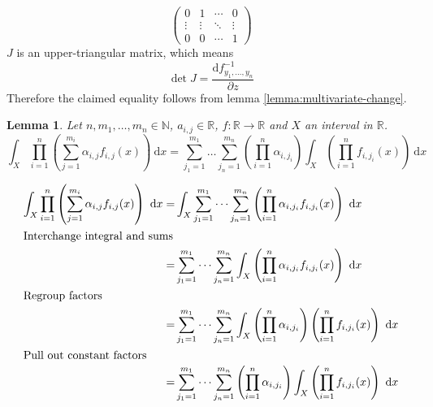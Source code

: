 \documentclass[11pt,a4paper]{book}
\newtheorem{lemma}{Lemma}
\begin{document}
\begin{proof2}
\begin{equation*}
\begin{pmatrix}
      0 & 1 & \cdots & 0\\
      \vdots & \vdots & \ddots & \vdots\\
      0 & 0 & \cdots & 1
    \end{pmatrix}
  \end{equation*}
  $J$ is an upper-triangular matrix, which means
  \begin{equation*}
    \det J = \frac{\mathrm{d}f_{y_{1}, \dots, y_{n}}^{-1}}{\partial z}
  \end{equation*}
  Therefore the claimed equality follows from lemma \ref{lemma:multivariate-change}.
\end{proof2}

\begin{lemma}
  \label{lemma:pull-out}
  Let $n, m_{1}, \dots, m_{n} \in \mathbb{N}$, $a_{i, j} \in \mathbb{R}$,
  $f : \mathbb{R} \rightarrow \mathbb{R}$ and $X$ an interval in $\mathbb{R}$.
  \begin{equation*}
    \int_{X} \prod_{i = 1}^{n} \left( \sum_{j = 1}^{m_{i}} \alpha_{i, j} f_{i, j}(x) \right)~\mathrm{d}x = \sum_{j_{1} = 1}^{m_{1}} \dots \sum_{j_{n} = 1}^{m_{n}} \left( \prod_{i = 1}^{n} \alpha_{i, j_{i}} \right) \int_{X} \left( \prod_{i = 1}^{n} f_{i, j_{i}}(x) \right)~\mathrm{d}x
  \end{equation*}
\end{lemma}
\begin{proof2}
  \begin{align*}
    \int_{X} \prod_{i = 1}^{n} \left( \sum_{j = 1}^{m_{i}} \alpha_{i, j} f_{i, j}(x) \right)~\mathrm{d}x = & \int_{X} \sum_{j_{1} = 1}^{m_{1}} \dots \sum_{j_{n} = 1}^{m_{n}} \left( \prod_{i = 1}^{n} \alpha_{i, j_{i}} f_{i, j_{i}}(x) \right)~\mathrm{d}x\\
    \intertext{Interchange integral and sums}
    = & \sum_{j_{1} = 1}^{m_{1}} \dots \sum_{j_{n} = 1}^{m_{n}} \int_{X} \left( \prod_{i = 1}^{n} \alpha_{i, j_{i}} f_{i, j_{i}}(x) \right)~\mathrm{d}x\\
    \intertext{Regroup factors}
    = & \sum_{j_{1} = 1}^{m_{1}} \dots \sum_{j_{n} = 1}^{m_{n}} \int_{X} \left( \prod_{i = 1}^{n} \alpha_{i, j_{i}} \right) \left( \prod_{i = 1}^{n} f_{i, j_{i}}(x) \right)~\mathrm{d}x\\
    \intertext{Pull out constant factors}
    = & \sum_{j_{1} = 1}^{m_{1}} \dots \sum_{j_{n} = 1}^{m_{n}} \left( \prod_{i = 1}^{n} \alpha_{i, j_{i}} \right) \int_{X} \left( \prod_{i = 1}^{n} f_{i, j_{i}}(x) \right)~\mathrm{d}x
  \end{align*}
\end{proof2}
\end{document}
